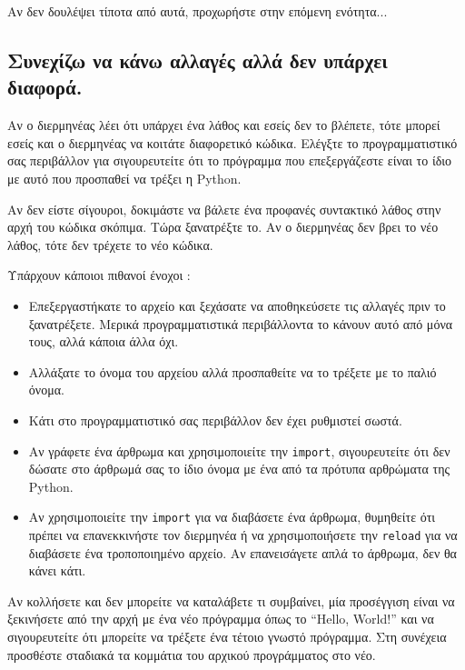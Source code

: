 \documentclass[10pt]{book}
\begin{document}
 Αν δεν δουλέψει τίποτα από αυτά, προχωρήστε στην επόμενη ενότητα...


\subsection{Συνεχίζω να κάνω αλλαγές αλλά δεν υπάρχει διαφορά.}

Αν ο διερμηνέας λέει ότι υπάρχει ένα λάθος και εσείς δεν το βλέπετε, τότε μπορεί εσείς και 
ο διερμηνέας να κοιτάτε διαφορετικό κώδικα.  Ελέγξτε το προγραμματιστικό σας περιβάλλον για 
σιγουρευτείτε ότι το πρόγραμμα που επεξεργάζεστε είναι το ίδιο με αυτό που προσπαθεί να τρέξει 
η  Python.

 Αν δεν είστε σίγουροι, δοκιμάστε να βάλετε ένα προφανές συντακτικό λάθος στην αρχή του 
κώδικα σκόπιμα.  Τώρα ξανατρέξτε το.  Αν ο διερμηνέας δεν βρει το νέο λάθος, τότε δεν τρέχετε 
το νέο κώδικα.

Υπάρχουν κάποιοι πιθανοί ένοχοι :

\begin{itemize}

\item  Επεξεργαστήκατε το αρχείο και ξεχάσατε να αποθηκεύσετε τις αλλαγές πριν το ξανατρέξετε.  Μερικά προγραμματιστικά περιβάλλοντα το κάνουν αυτό από μόνα τους, αλλά κάποια 
άλλα όχι. 

\item  Αλλάξατε το όνομα του αρχείου αλλά προσπαθείτε να το τρέξετε με το παλιό όνομα. 

\item  Κάτι στο προγραμματιστικό σας περιβάλλον δεν έχει ρυθμιστεί σωστά. 

\item  Αν γράφετε ένα άρθρωμα και χρησιμοποιείτε την  {\tt import},  σιγουρευτείτε 
ότι δεν δώσατε στο άρθρωμά σας το ίδιο όνομα με ένα από τα πρότυπα αρθρώματα της  Python.

\item  Αν χρησιμοποιείτε την {\tt import} για να διαβάσετε ένα άρθρωμα, θυμηθείτε 
ότι πρέπει να επανεκκινήστε τον διερμηνέα ή να χρησιμοποιήσετε την {\tt reload} για να 
διαβάσετε ένα τροποποιημένο αρχείο.  Αν επανεισάγετε απλά το άρθρωμα, δεν θα κάνει κάτι. 

\end{itemize}

 Αν κολλήσετε και δεν μπορείτε να καταλάβετε τι συμβαίνει, μία προσέγγιση είναι να ξεκινήσετε από την αρχή με ένα νέο πρόγραμμα όπως το  ``Hello, World!''  και να σιγουρευτείτε ότι μπορείτε να τρέξετε ένα τέτοιο γνωστό πρόγραμμα.  Στη συνέχεια προσθέστε σταδιακά τα κομμάτια του αρχικού προγράμματος στο νέο.
\end{document}
